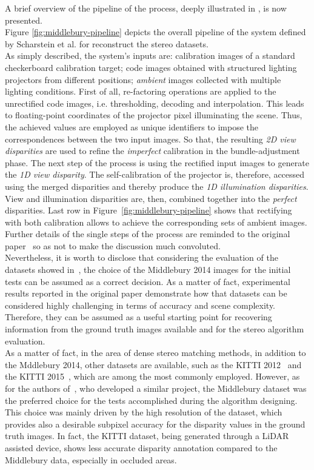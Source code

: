 A brief overview of the pipeline of the process, deeply illustrated in \cite{Scharstein2014}, is now presented.\\
Figure \ref{fig:middlebury-pipeline} depicts the overall pipeline of the system defined by Scharstein et al. \cite{Scharstein2014} for reconstruct the stereo datasets.\\
As simply described, the system's inputs are: calibration images of a standard checkerboard calibration target; code images obtained with structured lighting projectors from different positions; \textit{ambient} images collected with multiple lighting conditions. 
First of all, re-factoring operations are applied to the unrectified code images, i.e. thresholding, decoding and interpolation.
This leads to floating-point coordinates of the projector pixel illuminating the scene. 
Thus, the achieved values are employed as unique identifiers to impose the correspondences between the two input images. 
So that, the resulting \textit{2D view disparities} are used to refine the \textit{imperfect} calibration in the bundle-adjustment phase.
The next step of the process is using the rectified input images to generate the \textit{1D view disparity}.
The self-calibration of the projector is, therefore, accessed using the merged disparities and thereby produce the \textit{1D illumination disparities}.
View and illumination disparities are, then, combined together into the \textit{perfect} disparities. 
Last row in Figure~\ref{fig:middlebury-pipeline} shows that rectifying with both calibration allows to achieve the corresponding sets of ambient images.\\
Further details of the single steps of the process are reminded to the original paper~\cite{Scharstein2014} so as not to make the discussion much convoluted.\\
Nevertheless, it is worth to disclose that considering the evaluation of the datasets showed in~\cite{Scharstein2014}, the choice of the Middlebury 2014 images for the initial tests can be assumed as a correct decision.
As a matter of fact, experimental results reported in the original paper demonstrate how that datasets can be considered highly challenging in terms of accuracy and scene complexity.
Therefore, they can be assumed as a useful starting point for recovering information from the ground truth images available and for the stereo algorithm evaluation.\\
As a matter of fact, in the area of dense stereo matching methods, in addition to the Mddlebury 2014, other datasets are available, such as the KITTI 2012~\cite{geiger2013vision} and the KITTI 2015~\cite{menze2015object}, which are among the most commonly employed.
However, as for the authors of~\cite{Keselman2017}, who developed a similar project, the Middlebury dataset was the preferred choice for the tests accomplished during the algorithm designing.
This choice was mainly driven by the high resolution of the dataset, which provides also a desirable subpixel accuracy for the disparity values in the ground truth images. 
In fact, the KITTI dataset, being generated through a LiDAR assisted device, shows less accurate disparity annotation compared to the Middlebury data, especially in occluded areas.

